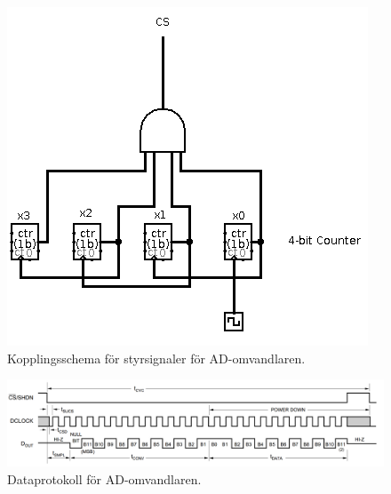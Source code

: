 \documentclass[a4paper,10pt]{article}
\begin{document}

\begin{figure}
\centering
\includegraphics[width=\textwidth]{adccircuit.png}
\caption{Kopplingsschema för styrsignaler för AD-omvandlaren.}
\label{adccircuit}
\end{figure}


\begin{figure}
\centering
\includegraphics[width=\textwidth]{adcdiagram.png}
\caption{Dataprotokoll för AD-omvandlaren.}
\label{adccircuit}
\end{figure}
\end{document}

